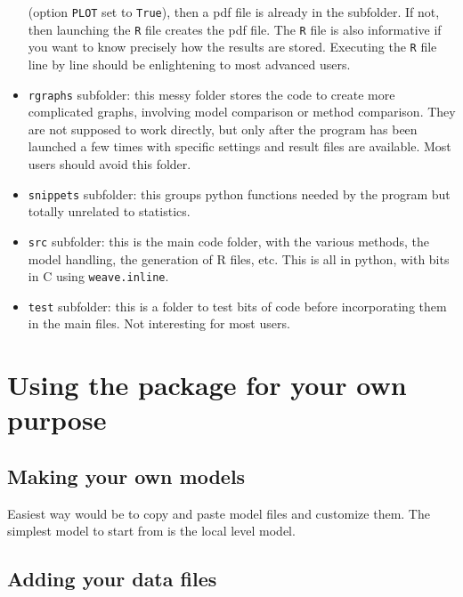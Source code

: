 \documentclass[a4paper,10pt]{paper}
\begin{document}
\begin{itemize}
(option \texttt{PLOT} set to \texttt{True}), then a pdf file is already in the subfolder. If not, then launching the \texttt{R} file creates the pdf file.
The \texttt{R} file is also informative if you want to know precisely how the results are stored. Executing the \texttt{R} file line by line should be enlightening to most advanced users.
 \item \texttt{rgraphs} subfolder: this messy folder stores the code to create more complicated graphs, involving model comparison or method comparison. They are not supposed to work directly, but only after the program has been launched a few times with specific settings and result files are available. Most users should avoid this folder.
 \item \texttt{snippets} subfolder: this groups python functions needed by the program but totally unrelated to statistics.
 \item \texttt{src} subfolder: this is the main code folder, with the various methods, the model handling, the generation of R files, etc. This is 
all in python, with bits in C using \texttt{weave.inline}.
 \item \texttt{test} subfolder: this is a folder to test bits of code before incorporating them in the main files. Not interesting for most users.
\end{itemize}


\section{Using the package for your own purpose}

\subsection{Making your own models}

Easiest way would be to copy and paste model files and customize them. The simplest model to start from is the local level model.

\subsection{Adding your data files}
\end{document}
